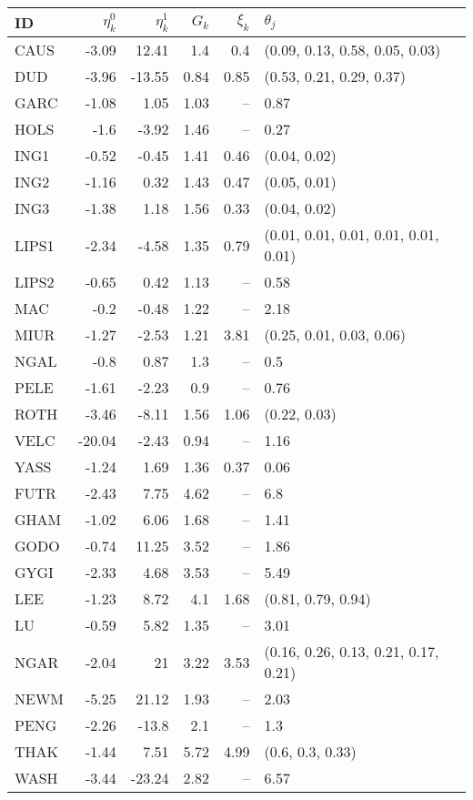 \begin{tabular}{lrrrrl}
 ID & $\eta^0_k$ & $\eta^1_k$ & $G_k$ & $\xi_k$ & $\theta_j$ \\ 
  \hline
\textsc{CAUS} & -3.09 & 12.41 & 1.4 & 0.4 & (0.09, 0.13, 0.58, 0.05, 0.03) \\ 
  \textsc{DUD} & -3.96 & -13.55 & 0.84 & 0.85 & (0.53, 0.21, 0.29, 0.37) \\ 
  \textsc{GARC} & -1.08 & 1.05 & 1.03 & -- & 0.87 \\ 
  \textsc{HOLS} & -1.6 & -3.92 & 1.46 & -- & 0.27 \\ 
  \textsc{ING1} & -0.52 & -0.45 & 1.41 & 0.46 & (0.04, 0.02) \\ 
  \textsc{ING2} & -1.16 & 0.32 & 1.43 & 0.47 & (0.05, 0.01) \\ 
  \textsc{ING3} & -1.38 & 1.18 & 1.56 & 0.33 & (0.04, 0.02) \\ 
  \textsc{LIPS1} & -2.34 & -4.58 & 1.35 & 0.79 & (0.01, 0.01, 0.01, 0.01, 0.01, 0.01) \\ 
  \textsc{LIPS2} & -0.65 & 0.42 & 1.13 & -- & 0.58 \\ 
  \textsc{MAC} & -0.2 & -0.48 & 1.22 & -- & 2.18 \\ 
  \textsc{MIUR} & -1.27 & -2.53 & 1.21 & 3.81 & (0.25, 0.01, 0.03, 0.06) \\ 
  \textsc{NGAL} & -0.8 & 0.87 & 1.3 & -- & 0.5 \\ 
  \textsc{PELE} & -1.61 & -2.23 & 0.9 & -- & 0.76 \\ 
  \textsc{ROTH} & -3.46 & -8.11 & 1.56 & 1.06 & (0.22, 0.03) \\ 
  \textsc{VELC} & -20.04 & -2.43 & 0.94 & -- & 1.16 \\ 
  \textsc{YASS} & -1.24 & 1.69 & 1.36 & 0.37 & 0.06 \\ 
   \hline
\textsc{FUTR} & -2.43 & 7.75 & 4.62 & -- & 6.8 \\ 
  \textsc{GHAM} & -1.02 & 6.06 & 1.68 & -- & 1.41 \\ 
  \textsc{GODO} & -0.74 & 11.25 & 3.52 & -- & 1.86 \\ 
  \textsc{GYGI} & -2.33 & 4.68 & 3.53 & -- & 5.49 \\ 
  \textsc{LEE} & -1.23 & 8.72 & 4.1 & 1.68 & (0.81, 0.79, 0.94) \\ 
  \textsc{LU} & -0.59 & 5.82 & 1.35 & -- & 3.01 \\ 
  \textsc{NGAR} & -2.04 & 21 & 3.22 & 3.53 & (0.16, 0.26, 0.13, 0.21, 0.17, 0.21) \\ 
  \textsc{NEWM} & -5.25 & 21.12 & 1.93 & -- & 2.03 \\ 
  \textsc{PENG} & -2.26 & -13.8 & 2.1 & -- & 1.3 \\ 
  \textsc{THAK} & -1.44 & 7.51 & 5.72 & 4.99 & (0.6, 0.3, 0.33) \\ 
  \textsc{WASH} & -3.44 & -23.24 & 2.82 & -- & 6.57 \\ 
   \hline
\end{tabular}
